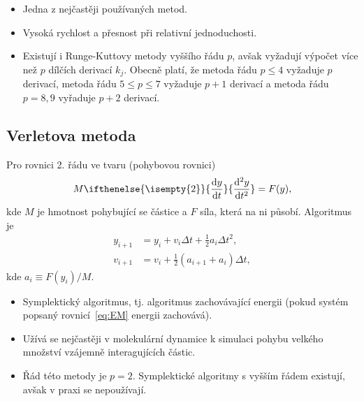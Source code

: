 \documentclass[a4paper,11pt,twoside]{article}
\renewcommand{\d}{\mathrm{d}}
\newcommand{\derivative}[3][]{\ifthenelse{\isempty{#1}}	    %
	{\frac{\d{#2}}{\d{#3}}}
	{\frac{\d^{#1}{#2}}{\d{#3}^{#1}}}
}
\begin{document}
        \begin{itemize}
            \item Jedna z nejčastěji používaných metod.
            \item Vysoká rychlost a přesnost při relativní jednoduchosti.
            \item Existují i Runge-Kuttovy metody vyššího řádu $p$, avšak vyžadují výpočet více než $p$ dílčích derivací $k_{j}$.
            Obecně platí, že metoda řádu $p\leq4$ vyžaduje $p$ derivací, metoda řádu $5\leq p\leq7$ vyžaduje $p+1$ derivací a metoda řádu $p=8,9$ vyřaduje $p+2$ derivací.
        \end{itemize}

    \subsection{Verletova metoda}\label{sec:Verlet}
        Pro rovnici 2. řádu ve tvaru (pohybovou rovnici)
        \begin{equation}\label{eq:EM}
            M\derivative[2]{y}{t}=F(y),
        \end{equation}
        kde $M$ je hmotnost pohybující se částice a $F$ síla, která na ni působí.
        Algoritmus je
        \begin{align}
            y_{i+1}&=y_{i}+v_{i}\Delta t+\frac{1}{2}a_{i}\Delta t^{2},\nonumber\\
            v_{i+1}&=v_{i}+\frac{1}{2}\left(a_{i+1}+a_{i}\right)\Delta t,
        \end{align}
        kde $a_{i}\equiv F(y_{i})/M$.

        \begin{itemize}
            \item Symplektický algoritmus, tj. algoritmus zachovávající energii (pokud systém popsaný rovnicí~\eqref{eq:EM} energii zachovává).
            \item Užívá se nejčastěji v molekulární dynamice k simulaci pohybu velkého množství vzájemně interagujících částic.
            \item Řád této metody je $p=2$. Symplektické algoritmy s vyšším řádem existují, avšak v praxi se nepoužívají.
        \end{itemize}
\end{document}
